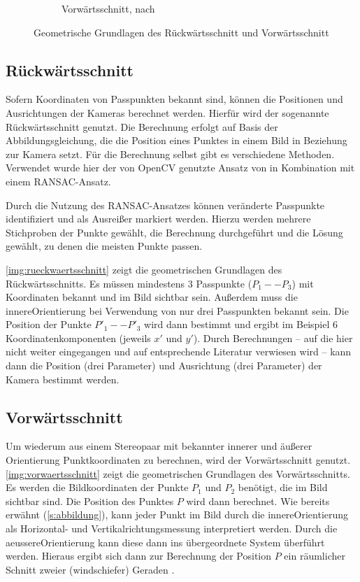 \documentclass[./00PhotoBox.tex]{subfiles}
\begin{document}
\begin{figure}
\begin{subfigure}{0.45\textwidth}
        \centering
        \caption{Vorwärtsschnitt, nach \citealt[S. 339]{luhmann}} %
        \label{img:vorwaertsschnitt} %
    \end{subfigure}
    \caption{Geometrische Grundlagen des Rückwärtsschnitt und Vorwärtsschnitt} %
\end{figure}


\subsection{Rückwärtsschnitt}
Sofern Koordinaten von Passpunkten bekannt sind, können die Positionen und Ausrichtungen der Kameras berechnet werden. Hierfür wird der sogenannte Rückwärtsschnitt genutzt. Die Berechnung erfolgt auf Basis der Abbildungsgleichung, die die Position eines Punktes in einem Bild in Beziehung zur Kamera setzt. Für die Berechnung selbst gibt es verschiedene Methoden. Verwendet wurde hier der von OpenCV genutzte Ansatz von \cite{Lepetit2008} in Kombination mit einem RANSAC-Ansatz.

Durch die Nutzung des RANSAC-Ansatzes können veränderte Passpunkte identifiziert und als Ausreißer markiert werden. Hierzu werden mehrere Stichproben der Punkte gewählt, die Berechnung durchgeführt und die Lösung gewählt, zu denen die meisten Punkte passen. \citep[S. 134]{luhmann}

\autoref{img:rueckwaertsschnitt} zeigt die geometrischen Grundlagen des Rückwärtsschnitts. Es müssen mindestens 3 Passpunkte ($P_1 - - P_3$) mit Koordinaten bekannt und im Bild sichtbar sein. Außerdem muss die \gls{innereOrientierung} bei Verwendung von nur drei Passpunkten bekannt sein. Die Position der Punkte $P'_1 - - P'_3$ wird dann bestimmt und ergibt im Beispiel 6 Koordinatenkomponenten (jeweils $x'$ und $y'$). Durch Berechnungen -- auf die hier nicht weiter eingegangen und auf entsprechende Literatur verwiesen wird -- kann dann die Position (drei Parameter) und Ausrichtung (drei Parameter) der Kamera bestimmt werden. \citep[S. 284]{luhmann}

\subsection{Vorwärtsschnitt}
Um wiederum aus einem Stereopaar mit bekannter innerer und äußerer Orientierung Punktkoordinaten zu berechnen, wird der Vorwärtsschnitt genutzt. \autoref{img:vorwaertsschnitt} zeigt die geometrischen Grundlagen des Vorwärtsschnitts. Es werden die Bildkoordinaten der Punkte $P_1$ und $P_2$ benötigt, die im Bild sichtbar sind. Die Position des Punktes $P$ wird dann berechnet. Wie bereits erwähnt (\autoref{s:abbildung}), kann jeder Punkt im Bild durch die \gls{innereOrientierung} als Horizontal- und Vertikalrichtungsmessung interpretiert werden. Durch die \gls{aeussereOrientierung} kann diese dann ins übergeordnete System überführt werden. Hieraus ergibt sich dann zur Berechnung der Position $P$ ein räumlicher Schnitt zweier (windschiefer) Geraden \citep[S. 95]{luhmann}.
\end{document}
